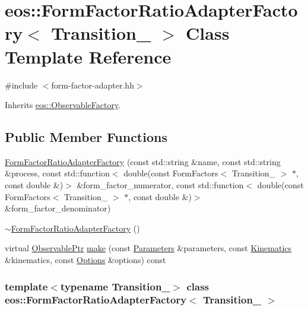 \hypertarget{classeos_1_1FormFactorRatioAdapterFactory}{
\section{eos::FormFactorRatioAdapterFactory$<$ Transition\_\- $>$ Class Template Reference}
\label{classeos_1_1FormFactorRatioAdapterFactory}
}


{\ttfamily \#include $<$form-\/factor-\/adapter.hh$>$}

Inherits \hyperlink{classeos_1_1ObservableFactory}{eos::ObservableFactory}.\subsection*{Public Member Functions}
\begin{DoxyCompactItemize}
\item 
\hyperlink{classeos_1_1FormFactorRatioAdapterFactory_ab689206dfaa84be97e8dd716212dd188}{FormFactorRatioAdapterFactory} (const std::string \&name, const std::string \&process, const std::function$<$ double(const FormFactors$<$ Transition\_\- $>$ $\ast$, const double \&)$>$ \&form\_\-factor\_\-numerator, const std::function$<$ double(const FormFactors$<$ Transition\_\- $>$ $\ast$, const double \&)$>$ \&form\_\-factor\_\-denominator)
\item 
\hyperlink{classeos_1_1FormFactorRatioAdapterFactory_a5a0c7286de7904c591dbf57d141e7216}{$\sim$FormFactorRatioAdapterFactory} ()
\item 
virtual \hyperlink{namespaceeos_a470e5dd806bd129080f1aa0c2954646f}{ObservablePtr} \hyperlink{classeos_1_1FormFactorRatioAdapterFactory_a2382bfbe9ce737d606a9d5abc271f92d}{make} (const \hyperlink{classeos_1_1Parameters}{Parameters} \&parameters, const \hyperlink{classeos_1_1Kinematics}{Kinematics} \&kinematics, const \hyperlink{classeos_1_1Options}{Options} \&options) const 
\end{DoxyCompactItemize}
\subsubsection*{template$<$typename Transition\_\-$>$ class eos::FormFactorRatioAdapterFactory$<$ Transition\_\- $>$}




